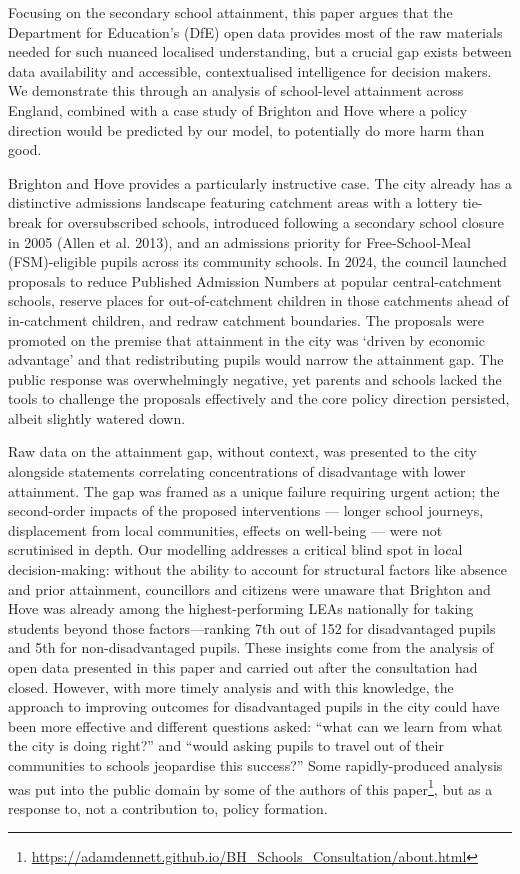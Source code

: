 \documentclass[
  12pt,
  titlepage]{article}
\begin{document}
Focusing on the secondary school attainment, this paper argues that the
Department for Education's (DfE) open data provides most of the raw
materials needed for such nuanced localised understanding, but a crucial
gap exists between data availability and accessible, contextualised
intelligence for decision makers. We demonstrate this through an
analysis of school-level attainment across England, combined with a case
study of Brighton and Hove where a policy direction would be predicted
by our model, to potentially do more harm than good.

Brighton and Hove provides a particularly instructive case. The city
already has a distinctive admissions landscape featuring catchment areas
with a lottery tie-break for oversubscribed schools, introduced
following a secondary school closure in 2005 (Allen et al. 2013), and an
admissions priority for Free-School-Meal (FSM)-eligible pupils across
its community schools. In 2024, the council launched proposals to reduce
Published Admission Numbers at popular central-catchment schools,
reserve places for out-of-catchment children in those catchments ahead
of in-catchment children, and redraw catchment boundaries. The proposals
were promoted on the premise that attainment in the city was `driven by
economic advantage' and that redistributing pupils would narrow the
attainment gap. The public response was overwhelmingly negative, yet
parents and schools lacked the tools to challenge the proposals
effectively and the core policy direction persisted, albeit slightly
watered down.

Raw data on the attainment gap, without context, was presented to the
city alongside statements correlating concentrations of disadvantage
with lower attainment. The gap was framed as a unique failure requiring
urgent action; the second-order impacts of the proposed interventions
--- longer school journeys, displacement from local communities, effects
on well-being --- were not scrutinised in depth. Our modelling addresses
a critical blind spot in local decision-making: without the ability to
account for structural factors like absence and prior attainment,
councillors and citizens were unaware that Brighton and Hove was already
among the highest-performing LEAs nationally for taking students beyond
those factors---ranking 7th out of 152 for disadvantaged pupils and 5th
for non-disadvantaged pupils. These insights come from the analysis of
open data presented in this paper and carried out after the consultation
had closed. However, with more timely analysis and with this knowledge,
the approach to improving outcomes for disadvantaged pupils in the city
could have been more effective and different questions asked: ``what can
we learn from what the city is doing right?'' and ``would asking pupils
to travel out of their communities to schools jeopardise this success?''
Some rapidly-produced analysis was put into the public domain by some of
the authors of this paper\footnote{\url{https://adamdennett.github.io/BH_Schools_Consultation/about.html}},
but as a response to, not a contribution to, policy formation.
\end{document}
